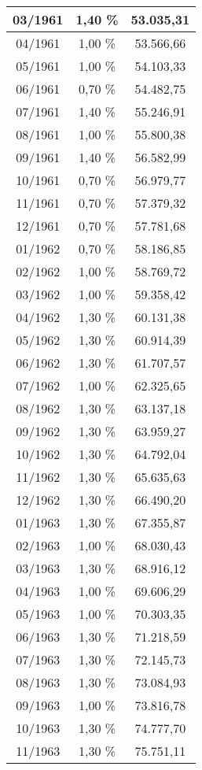 \begin{center}
\begin{longtable}{|c|c|c|}
03/1961 & 1,40 \% & 53.035,31 \\ \hline
04/1961 & 1,00 \% & 53.566,66 \\ \hline
05/1961 & 1,00 \% & 54.103,33 \\ \hline
06/1961 & 0,70 \% & 54.482,75 \\ \hline
07/1961 & 1,40 \% & 55.246,91 \\ \hline
08/1961 & 1,00 \% & 55.800,38 \\ \hline
09/1961 & 1,40 \% & 56.582,99 \\ \hline
10/1961 & 0,70 \% & 56.979,77 \\ \hline
11/1961 & 0,70 \% & 57.379,32 \\ \hline
12/1961 & 0,70 \% & 57.781,68 \\ \hline
01/1962 & 0,70 \% & 58.186,85 \\ \hline
02/1962 & 1,00 \% & 58.769,72 \\ \hline
03/1962 & 1,00 \% & 59.358,42 \\ \hline
04/1962 & 1,30 \% & 60.131,38 \\ \hline
05/1962 & 1,30 \% & 60.914,39 \\ \hline
06/1962 & 1,30 \% & 61.707,57 \\ \hline
07/1962 & 1,00 \% & 62.325,65 \\ \hline
08/1962 & 1,30 \% & 63.137,18 \\ \hline
09/1962 & 1,30 \% & 63.959,27 \\ \hline
10/1962 & 1,30 \% & 64.792,04 \\ \hline
11/1962 & 1,30 \% & 65.635,63 \\ \hline
12/1962 & 1,30 \% & 66.490,20 \\ \hline
01/1963 & 1,30 \% & 67.355,87 \\ \hline
02/1963 & 1,00 \% & 68.030,43 \\ \hline
03/1963 & 1,30 \% & 68.916,12 \\ \hline
04/1963 & 1,00 \% & 69.606,29 \\ \hline
05/1963 & 1,00 \% & 70.303,35 \\ \hline
06/1963 & 1,30 \% & 71.218,59 \\ \hline
07/1963 & 1,30 \% & 72.145,73 \\ \hline
08/1963 & 1,30 \% & 73.084,93 \\ \hline
09/1963 & 1,00 \% & 73.816,78 \\ \hline
10/1963 & 1,30 \% & 74.777,70 \\ \hline
11/1963 & 1,30 \% & 75.751,11 \\ \hline

\end{longtable}
\end{center}

